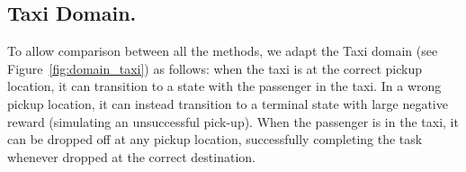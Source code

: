 



\subsection{Taxi Domain.}
To allow comparison between all the methods, we adapt the Taxi domain (see Figure~\ref{fig:domain_taxi}) as follows: when the taxi is at the correct pickup location, it can transition to a state with the passenger in the taxi.
In a wrong pickup location, it can instead transition to a terminal state with large negative reward (simulating an unsuccessful pick-up).
When the passenger is in the taxi, it can be dropped off at any pickup location, successfully completing the task whenever dropped at the correct destination.

